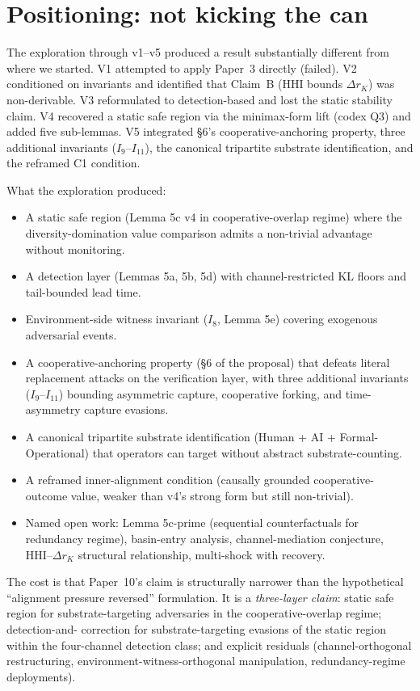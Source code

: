 \documentclass{article}
\begin{document}
\section{Positioning: not kicking the can}

The exploration through v1--v5 produced a result substantially
different from where we started.  V1 attempted to apply Paper~3
directly (failed).  V2 conditioned on invariants and identified
that Claim~B (HHI bounds $\Delta r_K$) was non-derivable.  V3
reformulated to detection-based and lost the static stability
claim.  V4 recovered a static safe region via the minimax-form
lift (codex Q3) and added five sub-lemmas.  V5 integrated \S6's
cooperative-anchoring property, three additional invariants
($I_9$--$I_{11}$), the canonical tripartite substrate
identification, and the reframed C1 condition.

What the exploration produced:

\begin{itemize}
\item A static safe region (Lemma 5c v4 in cooperative-overlap
  regime) where the diversity-domination value comparison admits
  a non-trivial advantage without monitoring.
\item A detection layer (Lemmas 5a, 5b, 5d) with channel-restricted
  KL floors and tail-bounded lead time.
\item Environment-side witness invariant ($I_8$, Lemma 5e) covering
  exogenous adversarial events.
\item A cooperative-anchoring property (\S6 of the proposal) that
  defeats literal replacement attacks on the verification layer,
  with three additional invariants ($I_9$--$I_{11}$) bounding
  asymmetric capture, cooperative forking, and time-asymmetry
  capture evasions.
\item A canonical tripartite substrate identification (Human + AI +
  Formal-Operational) that operators can target without abstract
  substrate-counting.
\item A reframed inner-alignment condition (causally grounded
  cooperative-outcome value, weaker than v4's strong form but still
  non-trivial).
\item Named open work: Lemma 5c-prime (sequential counterfactuals
  for redundancy regime), basin-entry analysis,
  channel-mediation conjecture, HHI--$\Delta r_K$ structural
  relationship, multi-shock with recovery.
\end{itemize}

The cost is that Paper~10's claim is structurally narrower than the
hypothetical ``alignment pressure reversed'' formulation.  It is a
\emph{three-layer claim}: static safe region for substrate-targeting
adversaries in the cooperative-overlap regime; detection-and-
correction for substrate-targeting evasions of the static region
within the four-channel detection class; and explicit residuals
(channel-orthogonal restructuring, environment-witness-orthogonal
manipulation, redundancy-regime deployments).
\end{document}
